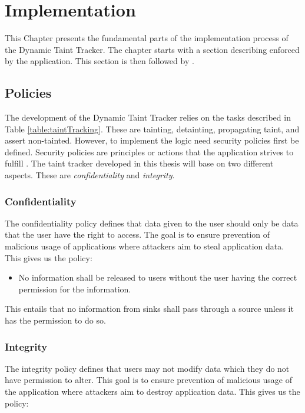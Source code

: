 \chapter{Implementation}
This Chapter presents the fundamental parts of the implementation process of the Dynamic Taint Tracker. The chapter starts with a section describing \textit{} enforced by the application. This section is then followed by \textit{}.



\section{Policies}
\label{Policies}
The development of the Dynamic Taint Tracker relies on the tasks described in Table \ref{table:taintTracking}. These are tainting, detainting, propagating taint, and assert non-tainted. However, to implement the logic need security policies first be defined. Security policies are principles or actions that the application strives to fulfill \parencite{BayukJenniferL2012Cspg}. The taint tracker developed in this thesis will base on two different aspects. These are \textit{confidentiality} and \textit{integrity}.



\subsection{Confidentiality}
The confidentiality policy defines that data given to the user should only be data that the user have the right to access. The goal is to ensure prevention of malicious usage of applications where attackers aim to steal application data. This gives us the policy:

\hfill
\begin{itemize}
    \item No information shall be released to users without the user having the correct permission for the information.
\end{itemize}
\hfill

This entails that no information from sinks shall pass through a source unless it has the permission to do so.



\subsection{Integrity}
The integrity policy defines that users may not modify data which they do not have permission to alter. This goal is to ensure prevention of malicious usage of the application where attackers aim to destroy application data. This gives us the policy:


